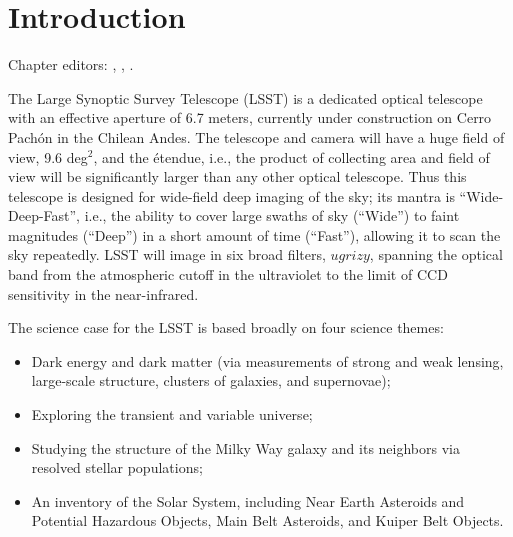 \chapter[Introduction]{Introduction}
\def\chpname{intro}\label{chp:\chpname}

Chapter editors:
,
,
.

The Large Synoptic Survey Telescope (LSST) is a dedicated optical
telescope with an effective aperture of 6.7 meters, currently under
construction on Cerro Pach\'on in the Chilean Andes.  The telescope
and camera will have a huge field of view, 9.6 deg$^2$, and the
\'etendue, i.e., the product of collecting area and field of view will
be significantly larger than any other optical telescope.  Thus this telescope
is designed for wide-field deep imaging of the sky; its mantra is
``Wide-Deep-Fast'', i.e., the ability to cover large swaths of sky
(``Wide'') to faint magnitudes (``Deep'') in a short amount of time
(``Fast''), allowing it to scan the sky repeatedly.  LSST will image
in six broad filters, $ugrizy$, spanning the optical band from the
atmospheric cutoff in the ultraviolet to the limit of CCD sensitivity
in the near-infrared.

  The science case for the LSST is based broadly on four science
  themes:
\begin{itemize}
\item Dark energy and dark matter (via measurements of strong and weak lensing,
  large-scale structure, clusters of galaxies, and supernovae);
\item Exploring the transient and variable universe;
\item Studying the structure of the Milky Way galaxy and its neighbors
  via resolved stellar populations;
\item An inventory of the Solar System, including Near Earth Asteroids
  and Potential Hazardous Objects, Main Belt Asteroids, and
  Kuiper Belt Objects.
\end{itemize}

